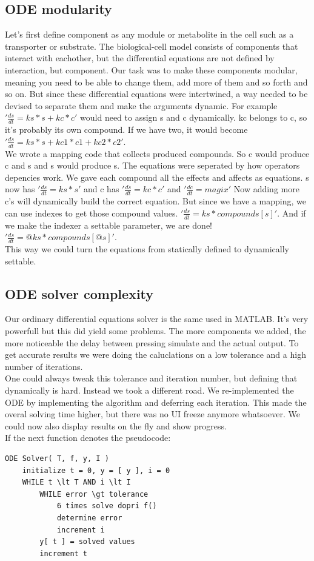 \documentclass[10pt,a4paper]{report}
\begin{document}
		\subsection{ODE modularity}
			Let's first define component as any module or metabolite in the cell such as a transporter or substrate. The biological-cell model consists of components that interact with eachother, but the differential equations are not defined by interaction, but component. Our task was to make these components modular, meaning you need to be able to change them, add more of them and so forth and so on. But since these differential equations were intertwined, a way needed to be devised to separate them and make the arguments dynamic. For example $'\frac{ds}{dt} = ks * s + kc * c'$ would need to assign s and c dynamically. kc belongs to c, so it's probably its own compound. If we have two, it would become $'\frac{ds}{dt} = ks * s + kc1 * c1 + kc2 * c2'$.\\
			We wrote a mapping code that collects produced compounds. So c would produce c and s and s would produce s. The equations were seperated by how operators depencies work. We gave each compound all the effects and affects as equations. s now has $'\frac{ds}{dt} = ks * s'$ and c has $'\frac{ds}{dt} = kc * c'$ and $'\frac{dc}{dt} = magix'$ Now adding more c's will dynamically build the correct equation. But since we have a mapping, we can use indexes to get those compound values. $'\frac{ds}{dt} = ks * compounds[s]'$. And if we make the indexer a settable parameter, we are done! $'\frac{ds}{dt} = @ks * compounds[@s]'$. \\
			This way we could turn the equations from statically defined to dynamically settable.
			
		\subsection{ODE solver complexity}
			Our ordinary differential equations solver is the same used in MATLAB. It's very powerfull but this did yield some problems. The more components we added, the more noticeable the delay between pressing simulate and the actual output. To get accurate results we were doing the caluclations on a low tolerance and a high number of iterations. \\
			One could always tweak this tolerance and iteration number, but defining that dynamically is hard. Instead we took a different road. We re-implemented the ODE by implementing the algorithm and deferring each iteration. This made the overal solving time higher, but there was no UI freeze anymore whatsoever. We could now also display results on the fly and show progress.\\
			If the next function denotes the pseudocode:\\
			\begin{lstlisting}
ODE Solver( T, f, y, I )
	initialize t = 0, y = [ y ], i = 0
	WHILE t \lt T AND i \lt I
		WHILE error \gt tolerance
			6 times solve dopri f()
			determine error
			increment i
		y[ t ] = solved values
		increment t
			\end{lstlisting}
\end{document}

